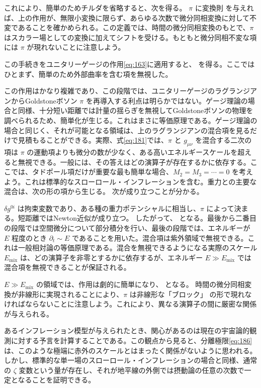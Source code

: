 これにより、簡単のためチルダを省略すると、次を得る。
\(\pi\) に変換則
を与えれば、上の作用が、無限小変換に限らず、あらゆる次数で微分同相変換に対して不変であることを確かめられる。この定義では、時間の微分同相変換のもとで、\(\pi\) はスカラー場としての変換に加えてシフトを受ける。もともと微分同相不変な項には \(\pi\) が現れないことに注意しよう。

この手続きをユニタリーゲージの作用\eqref{eq:163}に適用すると、
を得る。ここではひとまず、簡単のため外部曲率を含む項を無視した。

この作用はかなり複雑であり、この段階では、ユニタリーゲージのラグランジアンからGoldstoneボソン \(\pi\) を再導入する利点は明らかではない。ゲージ理論の場合と同様、十分短い距離では計量の揺らぎを無視してGoldstoneボソンの物理を調べられるため、簡単化が生じる。これはまさに等価原理である。ゲージ理論の場合と同じく、それが可能となる領域は、上のラグランジアンの混合項を見るだけで見積もることができる。実際、式\eqref{eq:181}では、\(\pi\) と \(g_{\mu\nu}\) を混合する二次の項は \(\pi\) の運動項よりも微分の数が少なく、ある高いエネルギースケールを超えると無視できる。一般には、その答えはどの演算子が存在するかに依存する。ここでは、タドポール項だけが重要な最も簡単な場合、\(M_2=M_3=\cdots=0\) を考えよう。これは標準的なスローロール・インフレーションを含む。重力との主要な混合は、次の形の項から生じる。
次が成り立つことが分かる。

\(\delta g^{0i}\) は拘束変数であり、ある種の重力ポテンシャルに相当し、\(\pi\) によって決まる。短距離ではNewton近似が成り立つ。
したがって、
となる。最後から二番目の段階では空間微分について部分積分を行い、最後の段階では、エネルギーが \(E\) 程度のとき \(\partial_t\sim E\) であることを用いた。混合項は紫外領域で無視できる。これは一般相対論の等価原理である。混合を無視できるようになる実際のスケール \(E_{\mathrm{mix}}\) は、どの演算子を非零とするかに依存するが、エネルギー \(E\gg E_{\mathrm{mix}}\) では混合項を無視できることが保証される。

\(E\gg E_{\mathrm{mix}}\) の領域では、作用は劇的に簡単になり、
となる。
時間の微分同相変換が非線形に実現されることにより、\(\pi\) は非線形な「ブロック」
の形で現れなければならないことに注意しよう。これにより、異なる演算子の間に厳密な関係が与えられる。

あるインフレーション模型が与えられたとき、関心があるのは現在の宇宙論的観測に対する予言を計算することである。この観点から見ると、分離極限\eqref{eq:186}は、このような極端に赤外のスケールとはまったく関係がないように思われる。しかし、標準的な単一場のスローロール・インフレーションの場合と同様、通常の \(\zeta\) 変数という量が存在し、それが地平線の外側では摂動論の任意の次数で一定となることを証明できる。

